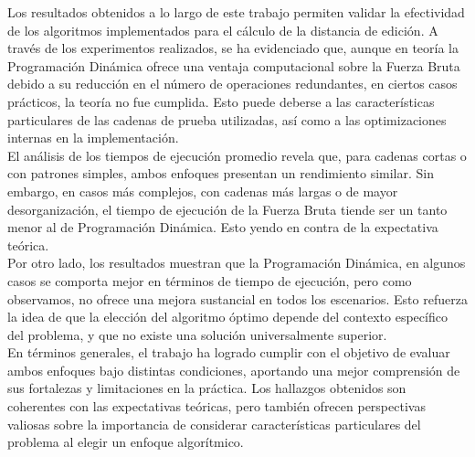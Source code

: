 Los resultados obtenidos a lo largo de este trabajo permiten validar la efectividad de los algoritmos implementados para el cálculo de la distancia de edición. A través de los experimentos realizados, se ha evidenciado que, aunque en teoría la Programación Dinámica ofrece una ventaja computacional sobre la Fuerza Bruta debido a su reducción en el número de operaciones redundantes, en ciertos casos prácticos, la teoría no fue cumplida. Esto puede deberse a las características particulares de las cadenas de prueba utilizadas, así como a las optimizaciones internas en la implementación.\\

\noindent El análisis de los tiempos de ejecución promedio revela que, para cadenas cortas o con patrones simples, ambos enfoques presentan un rendimiento similar. Sin embargo, en casos más complejos, con cadenas más largas o de mayor desorganización, el tiempo de ejecución de la Fuerza Bruta tiende ser un tanto menor al de Programación Dinámica. Esto yendo en contra de la expectativa teórica.\\

\noindent Por otro lado, los resultados muestran que la Programación Dinámica, en algunos casos se comporta mejor en términos de tiempo de ejecución, pero como observamos, no ofrece una mejora sustancial en todos los escenarios. Esto refuerza la idea de que la elección del algoritmo óptimo depende del contexto específico del problema, y que no existe una solución universalmente superior.\\

\noindent En términos generales, el trabajo ha logrado cumplir con el objetivo de evaluar ambos enfoques bajo distintas condiciones, aportando una mejor comprensión de sus fortalezas y limitaciones en la práctica. Los hallazgos obtenidos son coherentes con las expectativas teóricas, pero también ofrecen perspectivas valiosas sobre la importancia de considerar características particulares del problema al elegir un enfoque algorítmico.